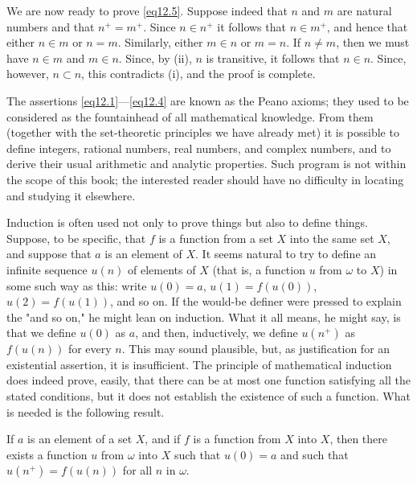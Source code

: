We are now ready to prove \eqref{eq12.5}. Suppose indeed that $n$ and $m$ are natural numbers and that $n^{+} = m^{+}$. Since $n \in n^{+}$ it follows that $n \in m^{+}$, and hence that either $n \in m$ or $n = m$. Similarly, either $m \in n$ or $m = n$. If $n \neq m$, then we must have $n \in m$ and $m \in n$. Since, by (ii), $n$ is transitive, it follows that $n \in n$. Since, however, $n \subset n$, this contradicts (i), and the proof is complete. 

The assertions \eqref{eq12.1}—\eqref{eq12.4} are known as the Peano axioms; they used to be considered as the fountainhead of all mathematical knowledge. From them (together with the set-theoretic principles we have already met) it is possible to define integers, rational numbers, real numbers, and complex numbers, and to derive their usual arithmetic and analytic  properties. Such program is not within the scope of this book; the interested reader should have no difficulty in locating and studying it elsewhere.

Induction is often used not only to prove things but also to define things. Suppose, to be specific, that $f$ is a function from a set $X$ into the same set $X$, and suppose that $a$ is an element of $X$. It seems natural to try to define an infinite sequence ${u(n)}$ of elements of $X$ (that is, a function $u$ from $\omega$ to $X$) in some such way as this: write $u(0) = a$, $u(1) = f(u(0))$, $u(2) = f(u(1))$, and so on. If the would-be definer were pressed to explain the "and so on," he might lean on induction. What it all means, he might say, is that we define $u(0)$ as $a$, and then, inductively, we define $u(n^{+})$ as $f(u(n))$ for every $n$. This may sound plausible, but, as justification for an existential assertion, it is insufficient. The principle of mathematical induction does indeed prove, easily, that there can be at most one function satisfying all the stated conditions, but it does not establish the existence of such a function. What is needed is the following result.

\begin{named} If $a$ is an element of a set $X$, and if $f$ is a function from $X$ into $X$, then there exists a function $u$ from $\omega$ into $X$ such that $u(0) = a$ and such that $u(n^{+}) = f(u(n))$ for all $n$ in $\omega$. 
\end{named}

